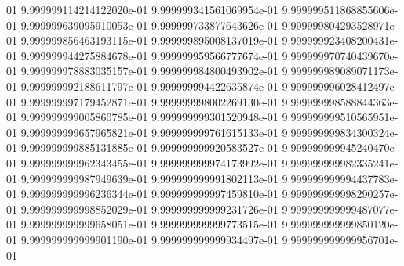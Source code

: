 01	9.999999114214122020e-01	9.999999341561069954e-01	9.999999511868855606e-01	9.999999639095910053e-01	9.999999733877643626e-01	9.999999804293528971e-01	9.999999856463193115e-01	9.999999895008137019e-01	9.999999923408200431e-01	9.999999944275884678e-01	9.999999959566777674e-01	9.999999970740439670e-01	9.999999978883035157e-01	9.999999984800493902e-01	9.999999989089071173e-01	9.999999992188611797e-01	9.999999994422635874e-01	9.999999996028412497e-01	9.999999997179452871e-01	9.999999998002269130e-01	9.999999998588844363e-01	9.999999999005860785e-01	9.999999999301520948e-01	9.999999999510565951e-01	9.999999999657965821e-01	9.999999999761615133e-01	9.999999999834300324e-01	9.999999999885131885e-01	9.999999999920583527e-01	9.999999999945240470e-01	9.999999999962343455e-01	9.999999999974173992e-01	9.999999999982335241e-01	9.999999999987949639e-01	9.999999999991802113e-01	9.999999999994437783e-01	9.999999999996236344e-01	9.999999999997459810e-01	9.999999999998290257e-01	9.999999999998852029e-01	9.999999999999231726e-01	9.999999999999487077e-01	9.999999999999658051e-01	9.999999999999773515e-01	9.999999999999850120e-01	9.999999999999901190e-01	9.999999999999934497e-01	9.999999999999956701e-01
